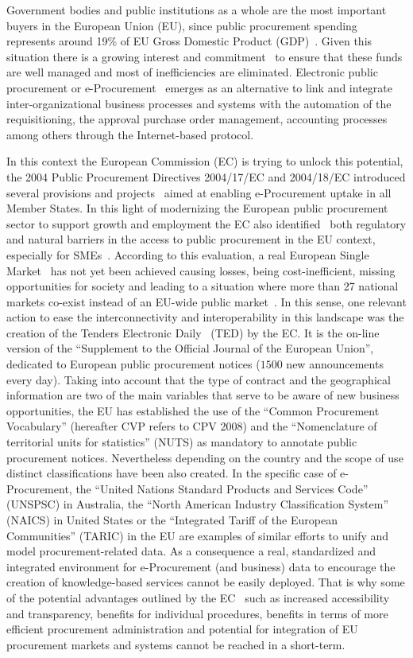 Government bodies and public institutions as a whole are the most important buyers in the European Union (EU), since public procurement spending represents around 19\% of 
EU Gross Domestic Product (GDP)~\cite{d2010}. Given this situation there is a growing interest and commitment~\cite{d2010a} to ensure that these funds are 
well managed and most of inefficiencies are eliminated. Electronic public procurement or e-Procurement~\cite{Podlogar2007} emerges as an alternative to link and 
integrate inter-organizational business processes and systems with the automation of the requisitioning, the approval purchase order 
management, accounting processes among others through the Internet-based protocol. 

In this context the European Commission (EC) is trying to unlock this potential, the 2004 Public Procurement Directives 2004/17/EC and 2004/18/EC 
introduced several provisions and projects~\cite{peppol,e-certis} aimed at enabling e-Procurement uptake in all Member States. In this light of 
modernizing the European public procurement sector to support growth and employment the EC also identified~\cite{siemensEval} 
both regulatory and natural barriers in the access to public procurement in the EU context, especially for SMEs~\cite{d2008}. 
According to this evaluation, a real European Single Market~\cite{d2011} has not yet been achieved causing losses, 
being cost-inefficient, missing opportunities for society and leading to a situation where more than 27 national markets 
co-exist instead of an EU-wide public market~\cite{monti2010}. In this sense, one relevant action to ease the interconnectivity and interoperability in this landscape was the creation of the Tenders Electronic Daily~\cite{eNotices,formsTed} (TED) 
by the EC. It is the on-line version of the ``Supplement to the Official Journal of the European Union'', dedicated to European public procurement notices 
($1500$ new announcements every day). Taking into account that the type of contract and the geographical information are two of the main variables 
that serve to be aware of new business opportunities, the EU has established the use of the ``Common Procurement Vocabulary'' (hereafter CVP refers to CPV 2008) 
and the ``Nomenclature of territorial units for statistics'' (NUTS) as mandatory to annotate public procurement notices. Nevertheless depending on the country and the 
scope of use distinct classifications have been also created. In the specific case of e-Procurement, the ``United Nations Standard Products and Services Code'' (UNSPSC) in Australia, the ``North American Industry Classification System'' (NAICS) in United States or 
the ``Integrated Tariff of the European Communities'' (TARIC) in the EU are examples of similar efforts to unify 
and model procurement-related data. As a consequence a real, standardized and integrated environment for e-Procurement (and business) data 
to encourage the creation of knowledge-based services cannot be easily deployed. That is why some of the potential advantages 
outlined by the EC~\cite{d2010} such as increased accessibility and transparency, benefits for individual procedures, 
benefits in terms of more efficient procurement administration and potential for integration of EU procurement markets and systems cannot be reached in a 
short-term. 

